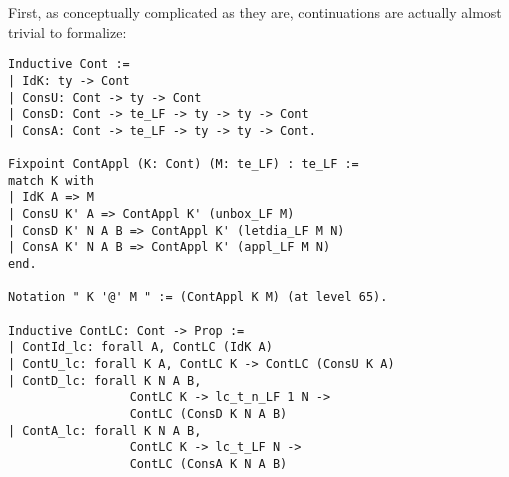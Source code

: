 First, as conceptually complicated as they are, continuations are actually almost trivial to formalize:
\begin{verbatim}
Inductive Cont :=
| IdK: ty -> Cont
| ConsU: Cont -> ty -> Cont
| ConsD: Cont -> te_LF -> ty -> ty -> Cont
| ConsA: Cont -> te_LF -> ty -> ty -> Cont.

Fixpoint ContAppl (K: Cont) (M: te_LF) : te_LF :=
match K with
| IdK A => M
| ConsU K' A => ContAppl K' (unbox_LF M)
| ConsD K' N A B => ContAppl K' (letdia_LF M N)
| ConsA K' N A B => ContAppl K' (appl_LF M N)
end.

Notation " K '@' M " := (ContAppl K M) (at level 65).

Inductive ContLC: Cont -> Prop :=
| ContId_lc: forall A, ContLC (IdK A)
| ContU_lc: forall K A, ContLC K -> ContLC (ConsU K A)
| ContD_lc: forall K N A B,
                 ContLC K -> lc_t_n_LF 1 N -> 
                 ContLC (ConsD K N A B)
| ContA_lc: forall K N A B,
                 ContLC K -> lc_t_LF N -> 
                 ContLC (ConsA K N A B)

\end{verbatim}

